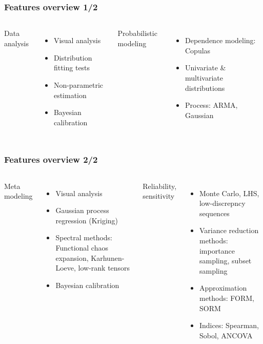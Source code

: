 \documentclass{beamer}
\begin{document}
\begin{frame}[containsverbatim]
\frametitle{Features overview 1/2}

  \begin{columns}
Data analysis
\begin{itemize}
\item Visual analysis
\item Distribution fitting tests
\item Non-parametric estimation
\item Bayesian calibration
\end{itemize}


Probabilistic modeling
\begin{itemize}
\item Dependence modeling: Copulas
\item Univariate \& multivariate distributions
\item Process: ARMA, Gaussian
\end{itemize}

\end{columns}

\end{frame}



\begin{frame}[containsverbatim]
\frametitle{Features overview 2/2}

  \begin{columns}
Meta modeling
\begin{itemize}
\item Visual analysis
\item Gaussian process regression (Kriging)
\item Spectral methods: Functional chaos expansion, Karhunen-Loeve, low-rank tensors
\item Bayesian calibration
\end{itemize}


Reliability, sensitivity
\begin{itemize}
\item Monte Carlo, LHS, low-discrepncy sequences
\item Variance reduction methods: importance sampling, subset sampling
\item Approximation methods: FORM, SORM
\item Indices: Spearman, Sobol, ANCOVA
\end{itemize}

\end{columns}

\end{frame}
\end{document}
